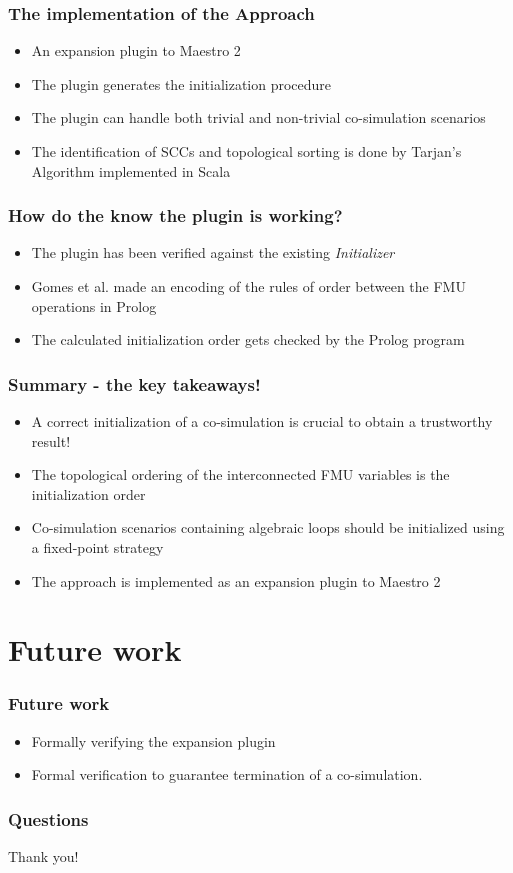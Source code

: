 \documentclass{beamer}
\begin{document}
\begin{frame}
\frametitle{The implementation of the Approach}
\begin{itemize}
    \item An expansion plugin to Maestro 2
    \item The plugin generates the initialization procedure
    \item The plugin can handle both trivial and non-trivial co-simulation scenarios
    \item The identification of SCCs and topological sorting is done by Tarjan's Algorithm implemented in Scala
\end{itemize}
\end{frame}

\begin{frame}
\frametitle{How do the know the plugin is working?}
\begin{itemize}
    \item The plugin has been verified against the existing \textit{Initializer}
    \item Gomes et al. made an encoding of the rules of order between the FMU operations in Prolog
    \item The calculated initialization order gets checked by the Prolog program
\end{itemize}
\end{frame}


\begin{frame}
\frametitle{Summary - the key takeaways!}
\begin{itemize}
    \item A correct initialization of a co-simulation is crucial to obtain a trustworthy result!
    \item The topological ordering of the interconnected FMU variables  is the initialization order
    \item Co-simulation scenarios containing algebraic loops should be initialized using a fixed-point strategy
    \item The approach is implemented as an expansion plugin to Maestro 2  
\end{itemize}
\end{frame}

\section{Future work}

\begin{frame}
\frametitle{Future work}
\begin{itemize}
    \item Formally verifying the expansion plugin  
    \item Formal verification to guarantee termination of a co-simulation.
\end{itemize}
\end{frame}

\begin{frame}
\frametitle{Questions}
\huge
Thank you!
\end{frame}
\end{document}
